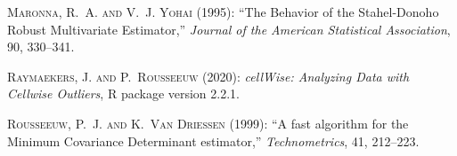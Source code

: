 \documentclass[a4paper,oneside,11pt,DIV=12]{scrartcl}
\begin{document}
\begin{thebibliography}{9}
\textsc{Maronna, R.~A. and V.~J. Yohai} (1995): \enquote{The Behavior of the
  Stahel-Donoho Robust Multivariate Estimator,} \emph{Journal of the American
  Statistical Association}, 90, 330--341.

\textsc{Raymaekers, J. and P.~Rousseeuw} (2020): \emph{cellWise: Analyzing Data
  with Cellwise Outliers}, {R} package version 2.2.1.

\textsc{Rousseeuw, P.~J. and K.~{Van Driessen}} (1999): \enquote{A fast
  algorithm for the Minimum Covariance Determinant estimator,}
  \emph{Technometrics}, 41, 212--223.
\end{thebibliography}
 
\end{document}
